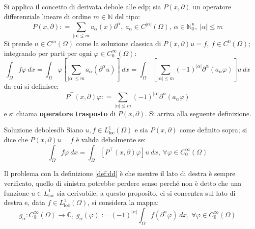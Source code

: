 \documentclass[10pt, a4paper]{scrartcl}
\theoremstyle{definition}
\numberwithin{esempio}{section}
\theoremstyle{definition}
\numberwithin{obs}{section}
\numberwithin{nota}{section}
\numberwithin{equation}{subsection}
\begin{document}
\noindent Si applica il concetto di derivata debole alle edp; sia $P(x,\partial )$ un operatore differenziale lineare di ordine $m\in \mathbb{N}$ del tipo:
\begin{equation}
	P(x,\partial ) : = \sum_{\left\lvert \alpha  \right\rvert \le m}^{} a_\alpha  (x) \partial ^\alpha , \ a_\alpha  \in C^{\left\lvert \alpha  \right\rvert } (\Omega ) , \ \alpha \in \mathbb{N}_0^n, \ \left\lvert \alpha  \right\rvert \le m
\end{equation}
Si prende $u \in C^m (\Omega )$ come la soluzione classica di $P(x,\partial ) u = f, \ f \in C^0 (\Omega )$; integrando per parti per ogni $\varphi \in C_0^\infty(\Omega )$:
\begin{equation*}
	\int_{\Omega } f \varphi  \ dx = \int_{\Omega } \varphi \left[ \sum_{\left\lvert \alpha  \right\rvert \le m}^{} a_\alpha (\partial ^\alpha u)\right]  \ dx = \int_{\Omega } \left[ \sum_{\left\lvert \alpha  \right\rvert \le m}^{} (-1)^{\left\lvert \alpha  \right\rvert } \partial ^\alpha  (a_\alpha  \varphi ) \right] u \ dx
\end{equation*}
da cui si definisce:
\begin{equation}
	P^\top (x,\partial ) \varphi  : = \sum_{\left\lvert \alpha  \right\rvert \le m}^{} (-1)^{\left\lvert \alpha  \right\rvert } \partial ^\alpha  (a_\alpha  \varphi )
\end{equation}
e si chiama \textbf{operatore trasposto} di $P(x,\partial )$. Si arriva alla seguente definizione.
\begin{definizione}
	{Soluzione debole}{sdb}
	Siano $u,f \in L^1_\text{loc}(\Omega )$ e sia $P(x,\partial )$ come definito sopra; si dice che $P(x,\partial ) u = f$ \`e valida debolmente se:
	\begin{equation}
		\int_{\Omega } f\varphi  \ dx = \int_{\Omega } \left[ P^\top(x,\partial ) \varphi  \right] u \ dx, \ \forall \varphi \in C_0^\infty (\Omega )
	\end{equation}
\end{definizione}
Il problema con la definizione \ref{def:dd} \`e che mentre il lato di destra \`e sempre verificato, quello di sinistra potrebbe perdere senso perch\'e non \`e detto che una funzione $u \in L^1_\text{loc}$ sia derivabile; a questo proposito, ci si concentra sul lato di destra e, data $f\in L^1_\text{loc}(\Omega )$, si considera la mappa:
\begin{equation}\label{distschel}
	g_\alpha  : C_0^\infty(\Omega )\to \mathbb{C}, \ g_\alpha (\varphi ) := (-1)^{\left\lvert \alpha  \right\rvert } \int_{\Omega } f (\partial ^\alpha  \varphi ) \ dx , \ \forall \varphi  \in C_0^\infty(\Omega )
\end{equation}
\end{document}
